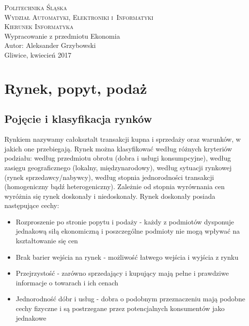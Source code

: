 \documentclass[12pt]{extarticle}
\begin{document}
\begin{titlepage}
    \begin{center}
        \textsc{\LARGE{Politechnika Śląska}}\\[0.5cm]
        \textsc{\LARGE{Wydział Automatyki, Elektroniki i~Informatyki}}\\[0.5cm]
        \textsc{\LARGE{Kierunek Informatyka}}\\[5.5cm]
        \LARGE{Wypracowanie z przedmiotu Ekonomia}\\[1cm]
        \LARGE{Autor: Aleksander Grzybowski}\\[1cm]
        \LARGE{Gliwice, kwiecień 2017}\\[1cm]
    \end{center}
\end{titlepage}



\section{Rynek, popyt, podaż}

\subsection{Pojęcie i klasyfikacja rynków}

Rynkiem nazywamy całoksztalt transakcji kupna i sprzedaży oraz warunków, w jakich one przebiegają. Rynek można klasyfikować według różnych kryteriów podziału: według przedmiotu obrotu (dobra i usługi konsumpcyjne), według zasięgu geograficznego (lokalny, międzynarodowy), według sytuacji rynkowej (rynek sprzedawcy/nabywcy), według stopnia jednorodności transakcji (homogeniczny bądź heterogeniczny). Zależnie od stopnia wyrównania cen wyróżnia się rynek doskonały i niedoskonały. Rynek doskonały posiada następujące cechy:

\begin{itemize}
	\item Rozproszenie po stronie popytu i podaży - każdy z podmiotów dysponuje jednakową siłą ekonomiczną i poszczególne podmioty nie mogą wpływać na kształtowanie się cen
	\item Brak barier wejścia na rynek - możliwość łatwego wejścia i wyjścia z rynku
	\item Przejrzystość - zarówno sprzedający i kupujący mają pełne i prawdziwe informacje o towarach i ich cenach
	\item Jednorodność dóbr i usług - dobra o podobnym przeznaczeniu mają podobne cechy fizyczne i są postrzegane przez potencjalnych konsumentów jako jednakowe
\end{itemize}
\end{document}

